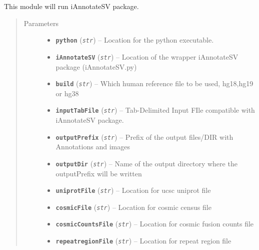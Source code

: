 \documentclass[letterpaper,10pt,english]{sphinxmanual}
\begin{document}
\begin{fulllineitems}
\label{iCallSV:iCallSV.Run_iAnnotateSV.run}
This module will run iAnnotateSV package.
\begin{quote}\begin{description}
\item[{Parameters}] \leavevmode\begin{itemize}
\item {} 
\textbf{\texttt{python}} (\emph{\texttt{str}}) -- Location for the python executable.

\item {} 
\textbf{\texttt{iAnnotateSV}} (\emph{\texttt{str}}) -- Location of the wrapper iAnnotateSV package (iAnnotateSV.py)

\item {} 
\textbf{\texttt{build}} (\emph{\texttt{str}}) -- Which human reference file to be used, hg18,hg19 or hg38

\item {} 
\textbf{\texttt{inputTabFile}} (\emph{\texttt{str}}) -- Tab-Delimited Input FIle compatible with iAnnotateSV package.

\item {} 
\textbf{\texttt{outputPrefix}} (\emph{\texttt{str}}) -- Prefix of the output files/DIR with Annotations and images

\item {} 
\textbf{\texttt{outputDir}} (\emph{\texttt{str}}) -- Name of the output directory where the outputPrefix will be written

\item {} 
\textbf{\texttt{uniprotFile}} (\emph{\texttt{str}}) -- Location for ucsc uniprot file

\item {} 
\textbf{\texttt{cosmicFile}} (\emph{\texttt{str}}) -- Location for cosmic census file

\item {} 
\textbf{\texttt{cosmicCountsFile}} (\emph{\texttt{str}}) -- Location for cosmic fusion counts file

\item {} 
\textbf{\texttt{repeatregionFile}} (\emph{\texttt{str}}) -- Location for repeat region file


\end{itemize}
\end{description}
\end{quote}
\end{fulllineitems}
\end{document}
